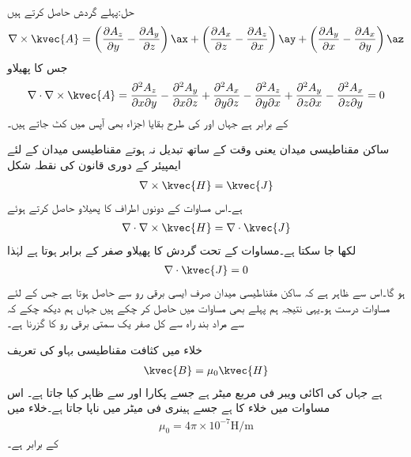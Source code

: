 حل:پہلے گردش حاصل کرتے ہیں
\begin{align*}
\nabla \times \kvec{A}=\left(\frac{\partial A_z}{\partial y}-\frac{\partial A_y}{\partial z} \right)\ax+\left(\frac{\partial A_x}{\partial z}-\frac{\partial A_z}{\partial x} \right)\ay+\left(\frac{\partial A_y}{\partial x}-\frac{\partial A_x}{\partial y} \right)\az
\end{align*}
جس کا پھیلاو
\begin{align*}
\nabla \cdot \nabla \times \kvec{A}=\frac{\partial^2 A_z}{\partial x \partial y}-\frac{\partial^2 A_y}{\partial x \partial z}+\frac{\partial^2 A_x}{\partial y \partial z}-\frac{\partial^2 A_z}{\partial y \partial x}+\frac{\partial^2 A_y}{\partial z \partial x}-\frac{\partial^2 A_x}{\partial z \partial y}=0
\end{align*}
کے برابر ہے جہاں  اور  کی طرح بقایا اجزاء بھی آپس میں کٹ جاتے ہیں۔

ساکن مقناطیسی میدان یعنی وقت کے ساتھ تبدیل نہ ہوتے مقناطیسی میدان کے لئے ایمپیئر کے دوری قانون کی نقطہ شکل
\begin{align*}
\nabla \times \kvec{H}=\kvec{J}
\end{align*}
ہے۔اس مساوات کے دونوں اطراف کا پھیلاو حاصل کرتے ہوئے
\begin{align*}
\nabla \cdot \nabla \times \kvec{H}=\nabla \cdot \kvec{J}
\end{align*}
لکھا جا سکتا ہے۔مساوات  کے تحت گردش کا پھیلاو صفر کے برابر ہوتا ہے لہٰذا
\begin{align}\label{مساوات_مقناطیسی_استمراری_مساوات}
\nabla \cdot \kvec{J}=0
\end{align}
ہو گا۔اس سے ظاہر ہے کہ ساکن مقناطیسی میدان صرف ایسی برقی رو سے حاصل ہوتا ہے  جس کے لئے مساوات  درست ہو۔یہی نتیجہ ہم پہلے بھی مساوات  میں حاصل کر چکے ہیں جہاں ہم دیکھ چکے کہ  سے مراد بند راہ سے کل صفر یک سمتی برقی رو کا گزرنا ہے۔

خلاء میں کثافت مقناطیسی بہاو  کی تعریف
\begin{align}\label{مساوات_مقناطیسی_میدان_بالمقابل_شدت}
\kvec{B}=\mu_0 \kvec{H}
\end{align}
ہے جہاں  کی اکائی ویبر فی مربع میٹر  ہے جسے  پکارا اور  سے ظاہر کیا جاتا ہے۔ اس مساوات میں  خلاء کا  ہے جسے ہینری فی میٹر  میں ناپا جاتا ہے۔خلاء میں
\begin{align}
\mu_0=4\pi \times 10^{-7} \si{\henry \per \meter}
\end{align}
کے برابر ہے۔

